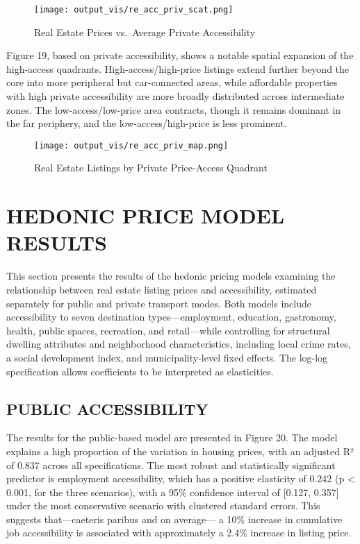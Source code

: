 \documentclass[
  12pt,
]{report}
\begin{document}
\begin{figure}[H]

{\centering \texttt{[image: output\_vis/re\_acc\_priv\_scat.png]}

}

\caption{Real Estate Prices vs.~Average Private Accessibility}

\end{figure}%

Figure 19, based on private accessibility, shows a notable spatial
expansion of the high-access quadrants. High-access/high-price listings
extend further beyond the core into more peripheral but car-connected
areas, while affordable properties with high private accessibility are
more broadly distributed across intermediate zones. The
low-access/low-price area contracts, though it remains dominant in the
far periphery, and the low-access/high-price is less prominent.

\begin{figure}[H]

{\centering \texttt{[image: output\_vis/re\_acc\_priv\_map.png]}

}

\caption{Real Estate Listings by Private Price-Access Quadrant}

\end{figure}%

\section{HEDONIC PRICE MODEL RESULTS}\label{hedonic-price-model-results}

This section presents the results of the hedonic pricing models
examining the relationship between real estate listing prices and
accessibility, estimated separately for public and private transport
modes. Both models include accessibility to seven destination
types---employment, education, gastronomy, health, public spaces,
recreation, and retail---while controlling for structural dwelling
attributes and neighborhood characteristics, including local crime
rates, a social development index, and municipality-level fixed effects.
The log-log specification allows coefficients to be interpreted as
elasticities.

\subsection{PUBLIC ACCESSIBILITY}\label{public-accessibility}

The results for the public-based model are presented in Figure 20. The
model explains a high proportion of the variation in housing prices,
with an adjusted R² of 0.837 across all specifications. The most robust
and statistically significant predictor is employment accessibility,
which has a positive elasticity of 0.242 (p \textless{} 0.001, for the
three scenarios), with a 95\% confidence interval of {[}0.127, 0.357{]}
under the most conservative scenario with clustered standard errors.
This suggests that---caeteris paribus and on average--- a 10\% increase
in cumulative job accessibility is associated with approximately a 2.4\%
increase in listing price.
\end{document}
